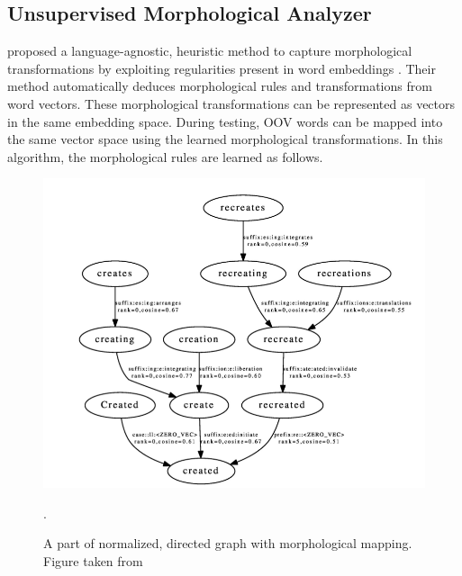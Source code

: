 \subsection{Unsupervised Morphological Analyzer}

\cite{soricut2015unsupervised} proposed a language-agnostic, heuristic method to capture morphological transformations by exploiting regularities present in word embeddings \citep{mikolov2013distributed}. Their method automatically deduces morphological rules and transformations from word vectors. These morphological transformations can be represented as vectors in the same embedding space. During testing, OOV words can be mapped into the same vector space using the learned morphological transformations. In this algorithm, the morphological rules are learned as follows.


\begin{figure}[ht]
	\centering
	\includegraphics[scale=0.5]{images/morph_graph}
	\caption{A part of normalized, directed graph with morphological mapping. Figure taken from  \cite{soricut2015unsupervised}}.
	\label{graph_morph}
\end{figure}


